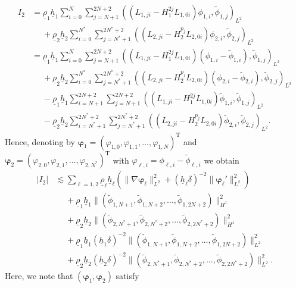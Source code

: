 \documentclass[11pt,leqno]{article}
\numberwithin{equation}{section}
\numberwithin{figure}{section}
\begin{document}
\begin{align*}
I_2
&= \underline{\rho}_1\underline{h}_1 \sum_{i=0}^N\sum_{j=N+1}^{2N+2}
  ((L_{1,ji}-H_1^{2j}L_{1,0i})\phi_{1,i},\tilde{\phi}_{1,j})_{L^2} \\
&\quad\;
 + \underline{\rho}_2\underline{h}_2 \sum_{i=0}^{N^*}\sum_{j=N^*+1}^{2N^*+2}
  ((L_{2,ji}-H_2^{p_j}L_{2,0i})\phi_{2,i},\tilde{\phi}_{2,j})_{L^2} \\
&= \underline{\rho}_1\underline{h}_1 \sum_{i=0}^N\sum_{j=N+1}^{2N+2}
  ((L_{1,ji}-H_1^{2j}L_{1,0i})(\phi_{1,i}-\tilde{\phi}_{1,i}),\tilde{\phi}_{1,j})_{L^2} \\
&\quad\;
 + \underline{\rho}_2\underline{h}_2 \sum_{i=0}^{N^*}\sum_{j=N^*+1}^{2N^*+2}
  ((L_{2,ji}-H_2^{p_j}L_{2,0i})(\phi_{2,i}-\tilde{\phi}_{2,i}),\tilde{\phi}_{2,j})_{L^2} \\
&\quad\;
 - \underline{\rho}_1\underline{h}_1 \sum_{i=N+1}^{2N+2}\sum_{j=N+1}^{2N+2}
  ((L_{1,ji}-H_1^{2j}L_{1,0i})\tilde{\phi}_{1,i},\tilde{\phi}_{1,j})_{L^2} \\
&\quad\;
 - \underline{\rho}_2\underline{h}_2 \sum_{i=N^*+1}^{2N^*+2}\sum_{j=N^*+1}^{2N^*+2}
  ((L_{2,ji}-H_2^{p_j}L_{2,0i})\tilde{\phi}_{2,i},\tilde{\phi}_{2,j})_{L^2}.
\end{align*}
%
Hence, denoting by $\bm{\varphi}_1=(\varphi_{1,0},\varphi_{1,1},\ldots,\varphi_{1,N})^\mathrm{T}$ and 
$\bm{\varphi}_2=(\varphi_{2,0},\varphi_{2,1},\ldots,\varphi_{2,N^*})^\mathrm{T}$ with 
$\varphi_{\ell,i}=\phi_{\ell,i}-\tilde{\phi}_{\ell,i}$ we obtain 
%
\begin{align*}
|I_2|
&\lesssim \sum_{\ell=1,2}\underline{\rho}_\ell\underline{h}_\ell
 ( \|\nabla\bm{\varphi}_\ell\|_{L^2}^2 + (\underline{h}_\ell\delta)^{-2}\|\bm{\varphi}_\ell'\|_{L^2}^2 ) \\
&\quad\;
 + \underline{\rho}_1\underline{h}_1
  \|(\tilde{\phi}_{1,N+1},\tilde{\phi}_{1,N+2},\ldots,\tilde{\phi}_{1,2N+2})\|_{H^1}^2 \\
&\quad\;
 + \underline{\rho}_2\underline{h}_2
  \|(\tilde{\phi}_{2,N^*+1},\tilde{\phi}_{2,N^*+2},\ldots,\tilde{\phi}_{2,2N^*+2})\|_{H^1}^2 \\
&\quad\;
 + \underline{\rho}_1\underline{h}_1(\underline{h}_1\delta)^{-2}
  \|(\tilde{\phi}_{1,N+1},\tilde{\phi}_{1,N+2},\ldots,\tilde{\phi}_{1,2N+2})\|_{L^2}^2 \\
&\quad\;
 + \underline{\rho}_2\underline{h}_2(\underline{h}_2\delta)^{-2}
 \|(\tilde{\phi}_{2,N^*+1},\tilde{\phi}_{2,N^*+2},\ldots,\tilde{\phi}_{2,2N^*+2})\|_{L^2}^2.
\end{align*}
%
Here, we note that $(\bm{\varphi}_1,\bm{\varphi}_2)$ satisfy 
\end{document}
